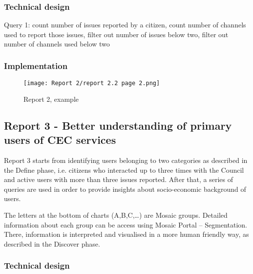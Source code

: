 			\subsubsection{Technical design}
			
Query 1: count number of issues reported by a citizen, count number of channels used to report those issues, filter out number of issues below two, filter out number of channels used below two
			
			\subsubsection{Implementation}

\begin{figure}[hp]
\centering
     \texttt{[image: Report 2/report 2.2 page 2.png]}
      \caption{Report 2, example}
\end{figure}
			
		\subsection{Report 3 - Better understanding of primary users of CEC services}
		
Report 3 starts from identifying users belonging to two categories as described in the Define phase, i.e. citizens who interacted up to three times with the Council and active users with more than three issues reported. After that, a series of queries are used in order to provide insights about socio-economic background of users.

The letters at the bottom of charts (A,B,C,…) are Mosaic groups. Detailed information about each group can be access using Mosaic Portal – Segmentation. There, information is interpreted and visualised in a more human friendly way, as described in the Discover phase.

			\subsubsection{Technical design}
			
